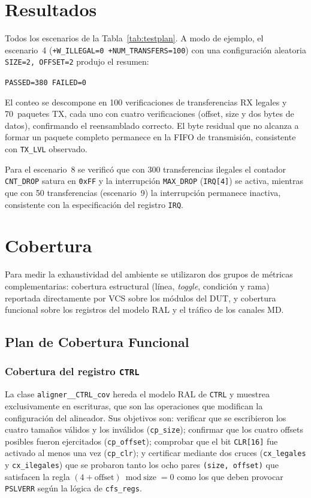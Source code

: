 \documentclass[conference]{IEEEtran}
\begin{document}
\section{Resultados}

Todos los escenarios de la Tabla~\ref{tab:testplan}. A modo de ejemplo, el escenario~4
(\texttt{+W\_ILLEGAL=0 +NUM\_TRANSFERS=100}) con una configuración aleatoria
\texttt{SIZE=2, OFFSET=2} produjo el resumen:
\begin{center}
\texttt{PASSED=380 \quad FAILED=0}
\end{center}
El conteo se descompone en 100 verificaciones de transferencias RX legales y
70~paquetes TX, cada uno con cuatro verificaciones (offset, size y dos bytes de
datos), confirmando el reensamblado correcto. El byte residual que no alcanza a
formar un paquete completo permanece en la FIFO de transmisión, consistente con
\texttt{TX\_LVL} observado.

Para el escenario~8 se verificó que con 300 transferencias ilegales el contador
\texttt{CNT\_DROP} satura en \texttt{0xFF} y la interrupción \texttt{MAX\_DROP}
(\texttt{IRQ[4]}) se activa, mientras que con 50 transferencias
(escenario~9) la interrupción permanece inactiva, consistente con la
especificación del registro \texttt{IRQ}.


\section{Cobertura}
\label{sec:cobertura}

Para medir la exhaustividad del ambiente se utilizaron dos grupos de
métricas complementarias: cobertura estructural (línea, \textit{toggle},
condición y rama) reportada directamente por VCS sobre los módulos del DUT,
y cobertura funcional sobre los registros del modelo RAL y el tráfico de los
canales MD.

\subsection{Plan de Cobertura Funcional}
\label{sec:cov_plan}
\subsubsection{Cobertura del registro \texttt{CTRL}}
La clase \texttt{aligner\_\_CTRL\_cov} hereda el modelo RAL de \texttt{CTRL}
y muestrea exclusivamente en escrituras, que son las operaciones que modifican
la configuración del alineador. Sus objetivos son: verificar que se escribieron
los cuatro tamaños válidos y los inválidos (\texttt{cp\_size}); confirmar que
los cuatro offsets posibles fueron ejercitados (\texttt{cp\_offset}); comprobar
que el bit \texttt{CLR[16]} fue activado al menos una vez (\texttt{cp\_clr});
y certificar mediante dos cruces (\texttt{cx\_legales} y \texttt{cx\_ilegales})
que se probaron tanto los ocho pares \texttt{(size, offset)} que satisfacen
la regla $(4+\text{offset})\bmod\text{size}=0$ como los que deben provocar
\texttt{PSLVERR} según la lógica de \texttt{cfs\_regs}.
\end{document}
